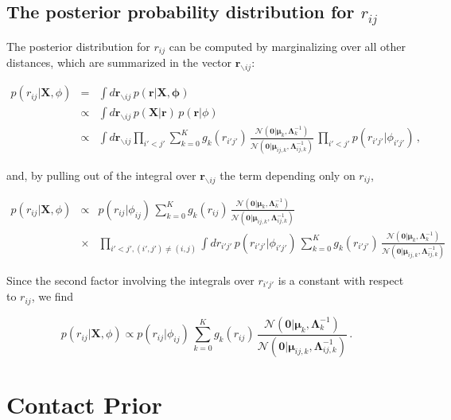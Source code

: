 \documentclass[12pt,a4paper,twoside]{book}
\newcommand{\Gauss}{\mathcal{N}}
\newcommand{\Lijk}{\mathbf{\Lambda}_{ij,k}}
\newcommand{\Lk}{\mathbf{\Lambda}_k}
\newcommand{\muijk}{\mathbf{\mu}_{ij,k}}
\newcommand{\muk}{\mathbf{\mu}_k}
\renewcommand{\r}{\mathbf{r}}
\newcommand{\rij}{r_{ij}}
\newcommand{\X}{\mathbf{X}}
\theoremstyle{definition}
\theoremstyle{definition}
\theoremstyle{remark}
\begin{document}
\section{\texorpdfstring{The posterior probability distribution for
\(\rij\)}{The posterior probability distribution for \textbackslash{}rij}}\label{posterior-of-rij}

The posterior distribution for \(r_{ij}\) can be computed by
marginalizing over all other distances, which are summarized in the
vector \(\r_{\backslash ij}\):

\begin{eqnarray}
    p(\rij | \X, \phi) &=& \int d \r_{\backslash ij} \, p(\r |\X, \mathbf{\phi})\\
                &\propto & \int d \r_{\backslash ij} \, p(\X|\r) \, p(\r | \phi) \\
                &\propto & \int d \r_{\backslash ij} \prod_{i'<j'} \sum_{k=0}^K g_{k}(r_{i'j'}) \, \frac{\Gauss( \mathbf{0} | \muk, \Lk^{-1})}{\Gauss(\mathbf{0} | \muijk, \Lijk^{-1})}
 \, \prod_{i'<j'} p(r_{i'j'} |\phi_{i'j'})  \,,
 \end{eqnarray}

and, by pulling out of the integral over \(\r_{\backslash ij}\) the term
depending only on \(\rij\),

\begin{eqnarray}
    p(\rij | \X, \phi) & \propto & 
            p(\rij |\phi_{ij}) \, \sum_{k=0}^K g_{k}(\rij) \, \frac{\Gauss( \mathbf{0} | \muk, \Lk^{-1})}{\Gauss(\mathbf{0} | \muijk, \Lijk^{-1})} \\
            & \times  & \prod_{i'<j', (i',j') \ne (i,j)} \int d r_{i'j'} \, p(r_{i'j'} |\phi_{i'j'}) \, \sum_{k=0}^K g_{k}(r_{i'j'}) \, \frac{\Gauss( \mathbf{0} | \muk, \Lk^{-1})}{\Gauss(\mathbf{0} | \muijk, \Lijk^{-1})}
\end{eqnarray}

Since the second factor involving the integrals over \(r_{i'j'}\) is a
constant with respect to \(\rij\), we find

\begin{equation}
    p(\rij | \X, \phi) \propto  
    p(\rij |\phi_{ij}) \,  \sum_{k=0}^K g_{k}(\rij) \, \frac{\Gauss( \mathbf{0} | \muk, \Lk^{-1})}{\Gauss(\mathbf{0} | \muijk, \Lijk^{-1})}  \, .
\label{eq:posterior-marginal-rij}
\end{equation}

\chapter{Contact Prior}\label{contact-prior}
\end{document}
